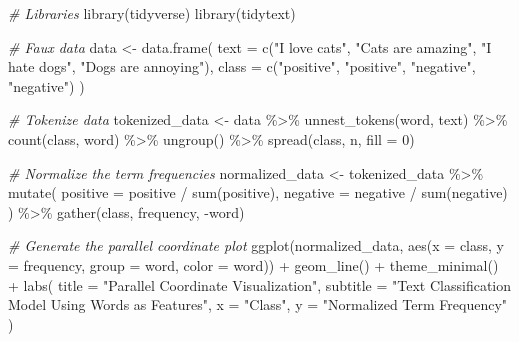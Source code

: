 \documentclass[
  letterpaper,
]{latex/krantz}
\newenvironment{Shaded}{\begin{snugshade}}{\end{snugshade}}
\newcommand{\AttributeTok}[1]{\textcolor[rgb]{0.00,0.00,0.00}{#1}}
\newcommand{\CommentTok}[1]{\textcolor[rgb]{0.00,0.00,0.00}{\textit{#1}}}
\newcommand{\DecValTok}[1]{\textcolor[rgb]{0.00,0.00,0.00}{#1}}
\newcommand{\FunctionTok}[1]{\textcolor[rgb]{0.00,0.00,0.00}{#1}}
\newcommand{\NormalTok}[1]{\textcolor[rgb]{0.00,0.00,0.00}{#1}}
\newcommand{\OtherTok}[1]{\textcolor[rgb]{0.00,0.00,0.00}{#1}}
\newcommand{\SpecialCharTok}[1]{\textcolor[rgb]{0.00,0.00,0.00}{#1}}
\newcommand{\StringTok}[1]{\textcolor[rgb]{0.00,0.00,0.00}{#1}}
\begin{document}
\begin{Shaded}
\begin{Highlighting}[]
\CommentTok{\# Libraries}
\FunctionTok{library}\NormalTok{(tidyverse)}
\FunctionTok{library}\NormalTok{(tidytext)}

\CommentTok{\# Faux data}
\NormalTok{data }\OtherTok{\textless{}{-}} \FunctionTok{data.frame}\NormalTok{(}
  \AttributeTok{text =} \FunctionTok{c}\NormalTok{(}\StringTok{"I love cats"}\NormalTok{, }\StringTok{"Cats are amazing"}\NormalTok{, }\StringTok{"I hate dogs"}\NormalTok{, }\StringTok{"Dogs are annoying"}\NormalTok{),}
  \AttributeTok{class =} \FunctionTok{c}\NormalTok{(}\StringTok{"positive"}\NormalTok{, }\StringTok{"positive"}\NormalTok{, }\StringTok{"negative"}\NormalTok{, }\StringTok{"negative"}\NormalTok{)}
\NormalTok{)}

\CommentTok{\# Tokenize data}
\NormalTok{tokenized\_data }\OtherTok{\textless{}{-}}\NormalTok{ data }\SpecialCharTok{\%\textgreater{}\%}
  \FunctionTok{unnest\_tokens}\NormalTok{(word, text) }\SpecialCharTok{\%\textgreater{}\%}
  \FunctionTok{count}\NormalTok{(class, word) }\SpecialCharTok{\%\textgreater{}\%}
  \FunctionTok{ungroup}\NormalTok{() }\SpecialCharTok{\%\textgreater{}\%}
  \FunctionTok{spread}\NormalTok{(class, n, }\AttributeTok{fill =} \DecValTok{0}\NormalTok{)}

\CommentTok{\# Normalize the term frequencies}
\NormalTok{normalized\_data }\OtherTok{\textless{}{-}}
\NormalTok{  tokenized\_data }\SpecialCharTok{\%\textgreater{}\%}
  \FunctionTok{mutate}\NormalTok{(}
    \AttributeTok{positive =}\NormalTok{ positive }\SpecialCharTok{/} \FunctionTok{sum}\NormalTok{(positive),}
    \AttributeTok{negative =}\NormalTok{ negative }\SpecialCharTok{/} \FunctionTok{sum}\NormalTok{(negative)}
\NormalTok{  ) }\SpecialCharTok{\%\textgreater{}\%}
  \FunctionTok{gather}\NormalTok{(class, frequency, }\SpecialCharTok{{-}}\NormalTok{word)}

\CommentTok{\# Generate the parallel coordinate plot}
\FunctionTok{ggplot}\NormalTok{(normalized\_data, }\FunctionTok{aes}\NormalTok{(}\AttributeTok{x =}\NormalTok{ class, }\AttributeTok{y =}\NormalTok{ frequency, }\AttributeTok{group =}\NormalTok{ word, }\AttributeTok{color =}\NormalTok{ word)) }\SpecialCharTok{+}
  \FunctionTok{geom\_line}\NormalTok{() }\SpecialCharTok{+}
  \FunctionTok{theme\_minimal}\NormalTok{() }\SpecialCharTok{+}
  \FunctionTok{labs}\NormalTok{(}
    \AttributeTok{title =} \StringTok{"Parallel Coordinate Visualization"}\NormalTok{,}
    \AttributeTok{subtitle =} \StringTok{"Text Classification Model Using Words as Features"}\NormalTok{,}
    \AttributeTok{x =} \StringTok{"Class"}\NormalTok{,}
    \AttributeTok{y =} \StringTok{"Normalized Term Frequency"}
\NormalTok{  )}
\end{Highlighting}
\end{Shaded}
\end{document}
